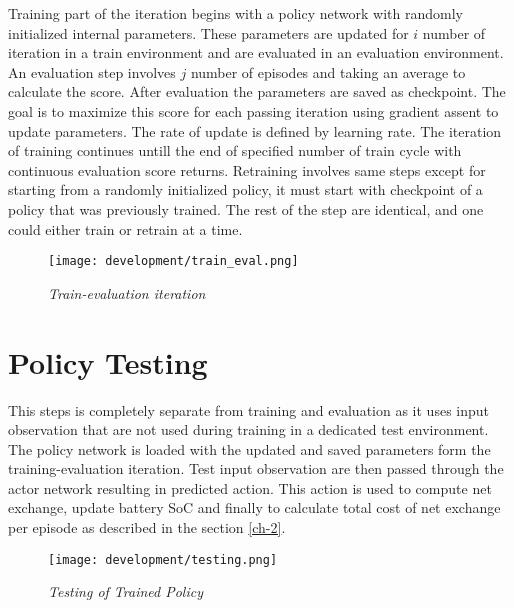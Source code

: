 \begin{large}
Training part of the iteration begins with a policy network with randomly initialized internal parameters. These parameters are updated for $i$ number of iteration in a train environment and are evaluated in an evaluation environment. An evaluation step involves $j$ number of episodes and taking an average to calculate the score. After evaluation the parameters are saved as checkpoint. The goal is to maximize this score for each passing iteration using gradient assent to update parameters. The rate of update is defined by learning rate. The iteration of training continues untill the end of specified number of train cycle with continuous evaluation score returns. Retraining involves same steps except for starting from a randomly initialized policy, it must start with checkpoint of a policy that was previously trained. The rest of the step are identical, and one could either train or retrain at a time. \\

\begin{figure}[h]
	\begin{center}
		\texttt{[image: development/train\_eval.png]}
		\caption{ \textit{Train-evaluation iteration} }
		\label{fig:dev_train_eval}
	\end{center}
\end{figure}

\section{Policy Testing}

This steps is completely separate from training and evaluation as it uses input observation that are not used during training in a dedicated test environment. The policy network is loaded with the updated and saved parameters form the training-evaluation iteration. Test input observation are then passed through the actor network resulting in predicted action. This action is used to compute net exchange, update battery SoC and finally to calculate total cost of net exchange per episode as described in the section \ref{ch-2}. \\

\begin{figure}[h]
	\begin{center}
		\texttt{[image: development/testing.png]}
		\caption{ \textit{Testing of Trained Policy} }
		\label{fig:dev_test}
	\end{center}
\end{figure}


\end{large}
